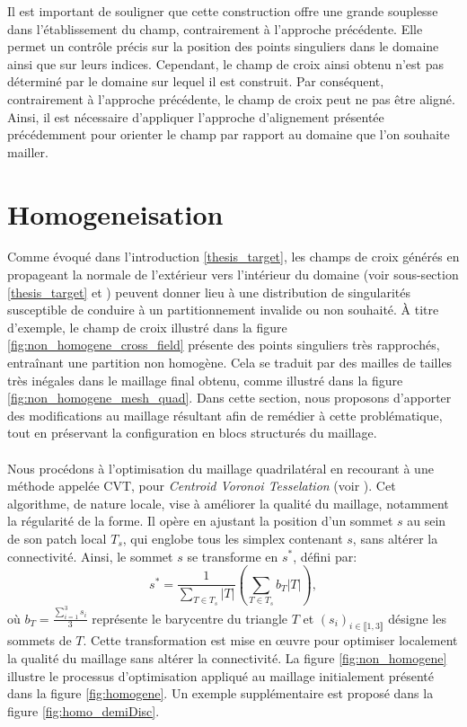 Il est important de souligner que cette construction offre une grande souplesse dans l'établissement du champ, contrairement à l'approche précédente. Elle permet un contrôle précis sur la position des points singuliers dans le domaine ainsi que sur leurs indices. Cependant, le champ de croix ainsi obtenu n'est pas déterminé par le domaine sur lequel il est construit. Par conséquent, contrairement à l'approche précédente, le champ de croix peut ne pas être aligné. Ainsi, il est nécessaire d'appliquer l'approche d'alignement présentée précédemment pour orienter le champ par rapport au domaine que l'on souhaite mailler.

\section{Homogeneisation}
\label{sec:Homogeneisation_algo}

Comme évoqué dans l'introduction \ref{thesis_target}, les champs de croix générés en propageant la normale de l'extérieur vers l'intérieur du domaine (voir sous-section \ref{thesis_target} et \cite{kowalski2013pde}) peuvent donner lieu à une distribution de singularités susceptible de conduire à un partitionnement invalide ou non souhaité. À titre d'exemple, le champ de croix illustré dans la figure \ref{fig:non_homogene_cross_field} présente des points singuliers très rapprochés, entraînant une partition non homogène. Cela se traduit par des mailles de tailles très inégales dans le maillage final obtenu, comme illustré dans la figure \ref{fig:non_homogene_mesh_quad}. Dans cette section, nous proposons d'apporter des modifications au maillage résultant afin de remédier à cette problématique, tout en préservant la configuration en blocs structurés du maillage.\\\\
Nous procédons à l'optimisation du maillage quadrilatéral en recourant à une méthode appelée CVT, pour \emph{Centroid Voronoi Tesselation} (voir \cite{chen2004mesh}). Cet algorithme, de nature locale, vise à améliorer la qualité du maillage, notamment la régularité de la forme. Il opère en ajustant la position d'un sommet $s$ au sein de son patch local $T_{s}$, qui englobe tous les simplex contenant $s$, sans altérer la connectivité. Ainsi, le sommet $s$ se transforme en $s^*$, défini par:
$$s^*=\displaystyle\frac{1}{\displaystyle\sum_{T\in T_s}|T|}\left(\displaystyle\sum_{T\in T_s}b_T|T|\right),$$
où $b_T=\frac{\sum_{i=1}^3s_i}{3}$ représente le barycentre du triangle $T$ et $(s_i)_{i\in\llbracket 1, 3\rrbracket}$ désigne les sommets de $T$. Cette transformation est mise en œuvre pour optimiser localement la qualité du maillage sans altérer la connectivité. La figure \ref{fig:non_homogene} illustre le processus d'optimisation appliqué au maillage initialement présenté dans la figure \ref{fig:homogene}. Un exemple supplémentaire est proposé dans la figure \ref{fig:homo_demiDisc}.

